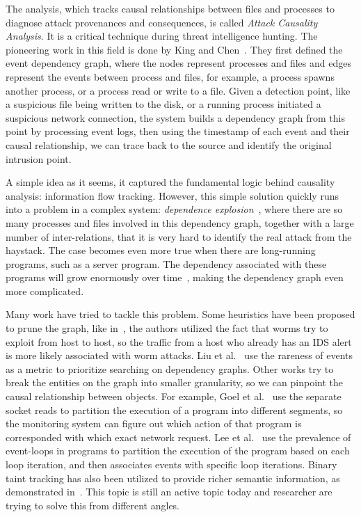 The analysis, which tracks causal relationships between files and 
processes to diagnose attack provenances and consequences, is called
\textit{Attack Causality Analysis}. It is a critical technique
during threat intelligence hunting. The pioneering work in this field
is done by King and Chen~\cite{king2003backtracking}. They first defined
the event dependency graph, where the nodes represent processes and files
and edges represent the events between process and files, for example,
a process spawns another process, or a process read or write to a 
file. Given a detection point, like a suspicious file being written to 
the disk, or a running process initiated a suspicious network connection, 
the system builds a dependency graph from this point by
processing event logs, then using the timestamp of each event and 
their causal relationship, we can trace back to the source and identify
the original intrusion point.

A simple idea as it seems, it captured the fundamental logic behind 
causality analysis: information flow tracking. However, this simple
solution quickly runs into a problem in a complex system: 
\textit{dependence explosion}~\cite{goel2005taser}, where there are 
so many processes and files involved in this dependency graph, together
with a large number of inter-relations, that it is very hard to identify the
real attack from the haystack. The case becomes even more true when there
are long-running programs, such as a server program. The dependency 
associated with these programs will grow enormously over 
time~\cite{lee2013high}, making the dependency graph even more 
complicated.

Many work have tried to tackle this problem. Some heuristics have been 
proposed to prune the graph, like in~\cite{king2005enriching}, the 
authors utilized the fact that worms try to exploit from host to host,
so the traffic from a host who already has an IDS alert is more likely
associated with worm attacks. Liu et al.~\cite{liu2018towards} use
the rareness of events as a metric to prioritize searching on dependency
graphs. Other works try to break the entities on the graph into smaller 
granularity, so we can pinpoint the causal relationship between objects.
For example, Goel et al.~\cite{goel2005taser} use the separate socket
reads to partition the execution of a program into different segments, 
so the monitoring system can figure out which action of that program
is corresponded with which exact network request. Lee et 
al.~\cite{lee2013high} use the prevalence of event-loops in programs to
partition the execution of the program based on each loop iteration,
and then associates events with specific loop iterations. Binary taint
tracking has also been utilized to provide richer semantic information, 
as demonstrated in~\cite{ma2016protracer}. This topic is still an 
active topic today and researcher are trying to solve this from different
angles.